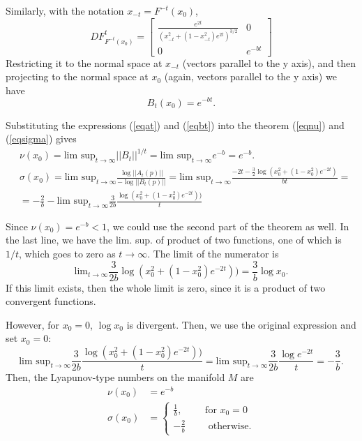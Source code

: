\documentclass[a4paper,11pt,pdftex]{article}
\begin{document}
Similarly, with the notation $x_{-t} = F^{-t}(x_0)$,
$$
DF^{t}_{F^{-t}(x_0)} = \begin{bmatrix} \frac{e^{2t}}{(x_{-t}^2 + (1-x_{-t}^2)e^{2t})^{3/2}} & 0 \\
0  & e^{-bt}\end{bmatrix}$$
Restricting it to the normal space at $x_{-t}$ (vectors parallel to the y axis), and then projecting to the normal space at $x_0$ (again, vectors parallel to the y axis) we have
\begin{equation}
\label{eqbt}
B_t(x_0) = e^{-bt}. 
\end{equation}

Substituting the expressions (\ref{eqat}) and (\ref{eqbt}) into the theorem (\ref{eqnu}) and (\ref{eqsigma}) gives
\begin{align*}
    &\nu(x_0) = \text{lim sup}_{t\to \infty} ||B_t||^{1/t} = \text{lim sup}_{t\to \infty} e^{-b} = e^{-b}. \\
    &\sigma(x_0) = \text{lim sup}_{t\to \infty} \frac{\log ||A_t(p)||}{-\log ||B_t(p)||} =\text{lim sup}_{t\to \infty}  \frac{-2t -\frac{3}{2}\log (x_0^2 + (1-x_0^2)e^{-2t})}{bt} = \\
    & = -\frac{2}{b} - \text{lim sup}_{t\to \infty} \frac{3}{2b}\frac{\log(x_0^2 + (1-x_0^2)e^{-2t}))}{t}
\end{align*}

Since $\nu(x_0) = e^{-b} <1 $, we could use the second part of the theorem as well. In the last line, we have the lim. sup. of product of two functions, one of which is $1/t$, which goes to zero as $t\to \infty$. 
The limit of the numerator is
$$
\text{lim}_{t\to \infty} \frac{3}{2b}\log(x_0^2 + (1-x_0^2)e^{-2t})) = \frac{3}{b}\log x_0.
$$
If this limit exists, then the whole limit is zero, since it is a product of two convergent functions. 

However, for $x_0=0$, $\log x_0$ is divergent. Then, we use the original expression and set $x_0=0$:
$$
\text{lim sup}_{t\to \infty} \frac{3}{2b}\frac{\log(x_0^2 + (1-x_0^2)e^{-2t}))}{t} = \text{lim sup}_{t\to \infty} \frac{3}{2b}\frac{\log e^{-2t}}{t} = -\frac{3}{b}.
$$
Then, the Lyapunov-type numbers on the manifold $M$ are
\begin{align*}
    \nu(x_0) &= e^{-b} \\
    \sigma(x_0) &= \begin{cases} \frac{1}{b}, \qquad \text{ for } x_0 = 0 \\
                    -\frac{2}{b} \qquad \text{ otherwise}.
    \end{cases}
\end{align*}
\end{document}
